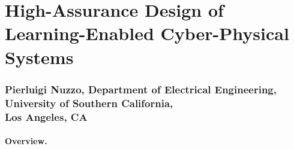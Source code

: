 \documentclass[10pt]{dod-blank}
\begin{document}
\section*{High-Assurance Design of Learning-Enabled Cyber-Physical Systems} 

\subsubsection*{Pierluigi Nuzzo, Department of Electrical Engineering, University of Southern California, \\ Los Angeles, CA}

\paragraph*{Overview.}
\end{document}

